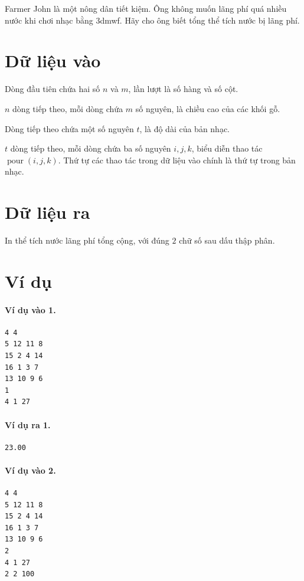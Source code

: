 \documentclass[11pt]{article}
\begin{document}
Farmer John là một nông dân tiết kiệm. Ông không muốn lãng phí quá nhiều nước
khi chơi nhạc bằng 3dmwf. Hãy cho ông biết tổng thể tích nước bị lãng phí.

\section{Dữ liệu vào}

Dòng đầu tiên chứa hai số \(n\) và \(m\), lần lượt là số hàng và số cột.

\(n\) dòng tiếp theo, mỗi dòng chứa \(m\) số nguyên, là chiều cao của các
khối gỗ.

Dòng tiếp theo chứa một số nguyên \(t\), là độ dài của bản nhạc.

\(t\) dòng tiếp theo, mỗi dòng chứa ba số nguyên \(i,j,k\), biểu diễn thao
tác \(\operatorname{pour}(i,j,k)\). Thứ tự các thao tác trong dữ liệu vào
chính là thứ tự trong bản nhạc.

\section{Dữ liệu ra}

In thể tích nước lãng phí tổng cộng, với đúng \(2\) chữ số sau dấu thập phân.

\section{Ví dụ}

\paragraph{Ví dụ vào 1.}
\begin{verbatim}
4 4
5 12 11 8
15 2 4 14
16 1 3 7
13 10 9 6
1
4 1 27
\end{verbatim}

\paragraph{Ví dụ ra 1.}
\begin{verbatim}
23.00
\end{verbatim}

\paragraph{Ví dụ vào 2.}
\begin{verbatim}
4 4
5 12 11 8
15 2 4 14
16 1 3 7
13 10 9 6
2
4 1 27
2 2 100
\end{verbatim}
\end{document}
